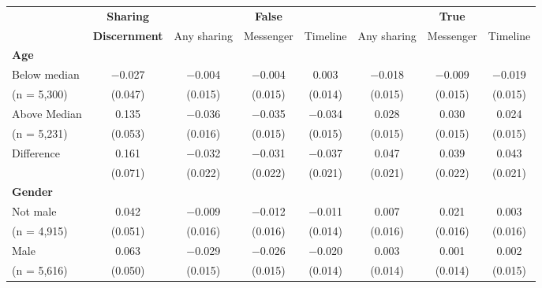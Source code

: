 
\begin{tabular}[t]{lccccccc}
 & \textbf{Sharing} &  & \textbf{False} &  &  & \textbf{True} & \\
 & \textbf{Discernment} & Any sharing & Messenger & Timeline & Any sharing & Messenger & Timeline\\\cmidrule(lr){2-2} \cmidrule(lr){3-5} \cmidrule(lr){6-8} \multicolumn{4}{l}{\textbf{Age}} \rule{0pt}{1.2\normalbaselineskip}\\
\hspace{1em} Below median & \num{-0.027} & \num{-0.004} & \num{-0.004} & \num{0.003} & \num{-0.018} & \num{-0.009} & \num{-0.019}\\
\hspace{2em}(n = 5,300) & (\num{0.047}) & (\num{0.015}) & (\num{0.015}) & (\num{0.014}) & (\num{0.015}) & (\num{0.015}) & (\num{0.015})\\
\hspace{1em} Above Median & \num{0.135} & \num{-0.036} & \num{-0.035} & \num{-0.034} & \num{0.028} & \num{0.030} & \num{0.024}\\
\hspace{2em}(n = 5,231) & (\num{0.053}) & (\num{0.016}) & (\num{0.015}) & (\num{0.015}) & (\num{0.015}) & (\num{0.015}) & (\num{0.015})\\\cmidrule(lr){2-8}
\hspace{1em} Difference & \num{0.161} & \num{-0.032} & \num{-0.031} & \num{-0.037} & \num{0.047} & \num{0.039} & \num{0.043}\\
\hspace{2em} & (\num{0.071}) & (\num{0.022}) & (\num{0.022}) & (\num{0.021}) & (\num{0.021}) & (\num{0.022}) & (\num{0.021})\\\multicolumn{4}{l}{\textbf{Gender}} \rule{0pt}{1.2\normalbaselineskip}\\
\hspace{1em} Not male & \num{0.042} & \num{-0.009} & \num{-0.012} & \num{-0.011} & \num{0.007} & \num{0.021} & \num{0.003}\\
\hspace{2em}(n = 4,915) & (\num{0.051}) & (\num{0.016}) & (\num{0.016}) & (\num{0.014}) & (\num{0.016}) & (\num{0.016}) & (\num{0.016})\\
\hspace{1em} Male & \num{0.063} & \num{-0.029} & \num{-0.026} & \num{-0.020} & \num{0.003} & \num{0.001} & \num{0.002}\\
\hspace{2em}(n = 5,616) & (\num{0.050}) & (\num{0.015}) & (\num{0.015}) & (\num{0.014}) & (\num{0.014}) & (\num{0.014}) & (\num{0.015})\\\cmidrule(lr){2-8}

\end{tabular}
